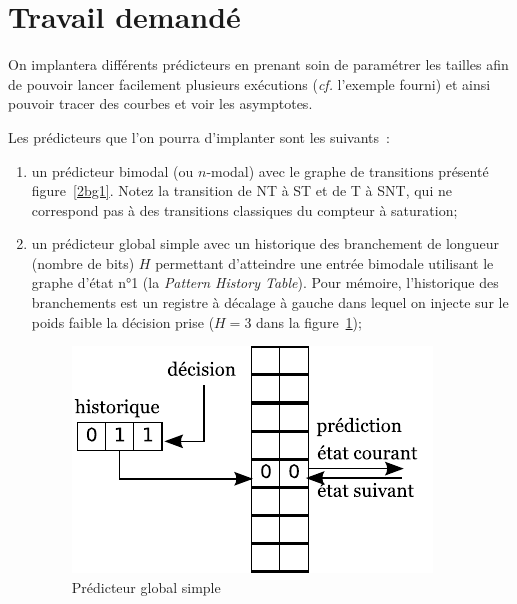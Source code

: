 \documentclass[a4paper]{article}
\begin{document}
\section{Travail demandé}
On implantera différents prédicteurs en prenant soin de paramétrer les tailles afin de pouvoir lancer facilement plusieurs exécutions (\emph{cf.} l'exemple fourni) et ainsi pouvoir tracer des courbes et voir les asymptotes.

Les prédicteurs que l'on pourra d'implanter sont les suivants~:
\begin{enumerate}
\item un prédicteur bimodal (ou $n$-modal) avec le graphe de transitions présenté figure~\ref{2bg1}.
      Notez la transition de NT à ST et de T à SNT, qui ne correspond pas à des transitions classiques du compteur à saturation;

\item un prédicteur global simple avec un historique des branchement de longueur (nombre de bits) $H$ permettant d'atteindre une entrée bimodale utilisant le graphe d'état n°1 (la \emph{Pattern History Table}).
      Pour mémoire, l'historique des branchements est un registre à décalage à gauche dans lequel on injecte sur le poids faible la décision prise ($H=3$ dans la figure~\ref{global-simple});
      \begin{figure}[hbt]\center\leavevmode
      \includegraphics[scale=.9]{global-simple}
      \caption{Prédicteur global simple}
      \label{global-simple}
      \end{figure}


\end{enumerate}
\end{document}
